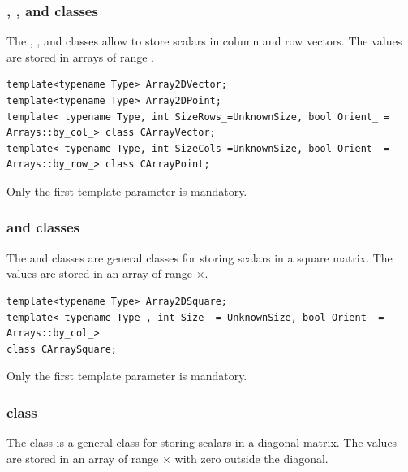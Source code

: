 \documentclass[a4paper,10pt]{article}
\begin{document}
\subsubsection{, ,   and  classes}

The , ,  
and   classes allow to store scalars in column and row
vectors. The values are stored in arrays of range \code{[begin:end)}.

\begin{lstlisting}[style=customcpp]
template<typename Type> Array2DVector;
template<typename Type> Array2DPoint;
template< typename Type, int SizeRows_=UnknownSize, bool Orient_ = Arrays::by_col_> class CArrayVector;
template< typename Type, int SizeCols_=UnknownSize, bool Orient_ = Arrays::by_row_> class CArrayPoint;
\end{lstlisting}

\begin{note}
Only the first template parameter is mandatory.
\end{note}

\subsubsection{ and  classes}

The  and   classes are general classes for storing scalars in
a square matrix. The values are stored in an array of range \code{[begin:end)}$\times$\code{[begin:end)}.

\begin{lstlisting}[style=customcpp]
template<typename Type> Array2DSquare;
template< typename Type_, int Size_ = UnknownSize, bool Orient_ = Arrays::by_col_>
class CArraySquare;
\end{lstlisting}

\begin{note}
Only the first template parameter is mandatory.
\end{note}


\subsubsection{ class}


The  class is a general class for storing scalars in
a diagonal matrix. The values are stored in an array of range
\code{[begin:end)}$\times$\code{[begin:end)} with zero outside the diagonal.
\end{document}
